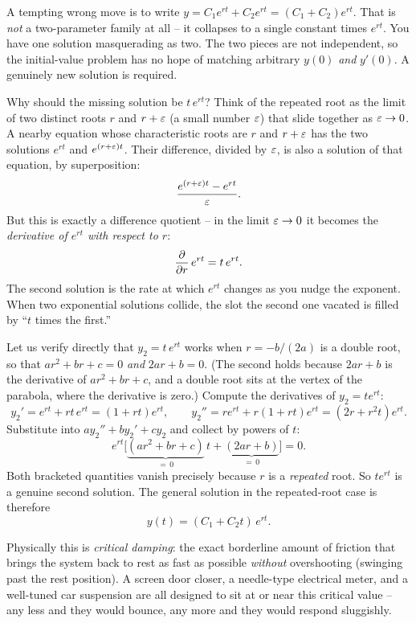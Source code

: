 \begin{trapbox}
A tempting wrong move is to write $y = C_1 e^{rt} + C_2 e^{rt} = (C_1 + C_2)
e^{rt}$. That is \emph{not} a two-parameter family at all -- it collapses to a
single constant times $e^{rt}$. You have one solution masquerading as two. The
two pieces are not independent, so the initial-value problem has no hope of
matching arbitrary $y(0)$ \emph{and} $y'(0)$. A genuinely new solution is
required.
\end{trapbox}

\begin{happeningbox}
Why should the missing solution be $t\,e^{rt}$? Think of the
repeated root as the limit of two distinct roots $r$ and $r + \varepsilon$ (a small
number $\varepsilon$) that slide together as $\varepsilon \to 0$. A nearby equation whose
characteristic roots are $r$ and $r+\varepsilon$ has the two solutions
$e^{rt}$ and $e^{(r+\varepsilon)t}$. Their difference, divided by $\varepsilon$, is also a
solution of that equation, by superposition:
\[
  \frac{e^{(r+\varepsilon)t} - e^{rt}}{\varepsilon}.
\]
But this is exactly a difference quotient -- in the limit $\varepsilon \to 0$ it becomes
the \emph{derivative of $e^{rt}$ with respect to $r$}:
\[
  \frac{\partial }{\partial r}\, e^{rt} = t\,e^{rt}.
\]
The second solution is the rate at which $e^{rt}$ changes as you nudge the
exponent. When two exponential solutions collide, the slot the second one
vacated is filled by ``$t$ times the first.''
\end{happeningbox}

Let us verify directly that $y_2 = t\,e^{rt}$ works when $r = -b/(2a)$ is a double
root, so that $a r^2 + b r + c = 0$ \emph{and} $2 a r + b = 0$. (The second
holds because $2ar + b$ is the derivative of $ar^2 + br + c$, and a double root
sits at the vertex of the parabola, where the derivative is zero.) Compute the derivatives of $y_2 = t e^{rt}$:
\[
  y_2' = e^{rt} + r t\, e^{rt} = (1 + rt)e^{rt},
  \qquad
  y_2'' = r e^{rt} + r(1+rt)e^{rt} = (2r + r^2 t)e^{rt}.
\]
Substitute into $a y_2'' + b y_2' + c y_2$ and collect by powers of $t$:
\[
  e^{rt}\Big[\underbrace{(a r^2 + b r + c)}_{=\,0}\, t
  + \underbrace{(2 a r + b)}_{=\,0}\Big] = 0.
\]
Both bracketed quantities vanish precisely because $r$ is a \emph{repeated} root.
So $t e^{rt}$ is a genuine second solution. The general solution in the
repeated-root case is therefore
\begin{equation}
  \boxed{\,y(t) = (C_1 + C_2 t)\,e^{rt}.\,}
  \label{ch38:repeated-general}
\end{equation}

Physically this is \emph{critical damping}: the exact borderline amount of
friction that brings the system back to rest as fast as possible \emph{without}
overshooting (swinging past the rest position). A screen door closer, a
needle-type electrical meter, and a well-tuned
car suspension are all designed to sit at or near this critical value -- any less
and they would bounce, any more and they would respond sluggishly.

